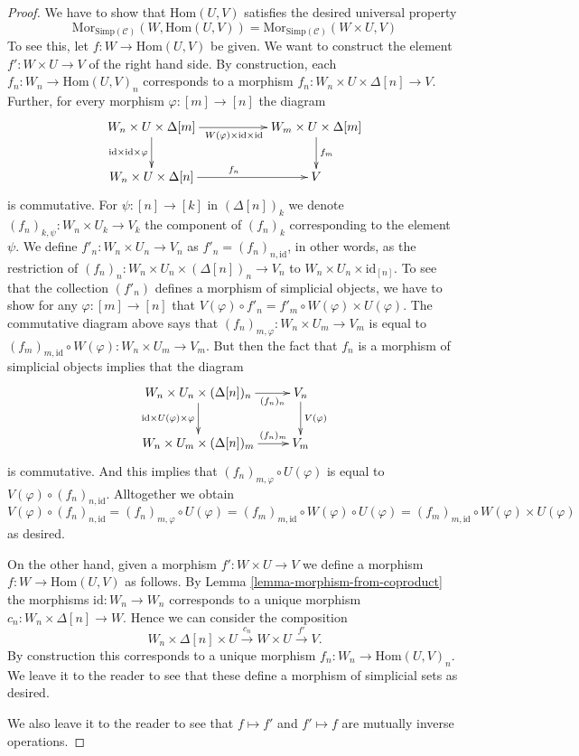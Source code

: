 \begin{proof}
\medskip\noindent
We have to show that $\text{Hom}(U, V)$ satisfies the desired
universal property
$$
\text{Mor}_{\text{Simp}(\mathcal{C})}(W, \text{Hom}(U, V))
=
\text{Mor}_{\text{Simp}(\mathcal{C})}(W \times U, V)
$$
To see this, let $f : W \to \text{Hom}(U, V)$ be given.
We want to construct the element $f' : W \times U \to V$
of the right hand side.
By construction, each $f_n : W_n \to \text{Hom}(U, V)_n$
corresponds to a morphism
$f_n : W_n \times U \times \Delta[n] \to V$. Further,
for every morphism $\varphi : [m] \to [n]$ the
diagram 
$$
\xymatrix{
W_n \times U \times \Delta[m]
\ar[rr]_{W(\varphi)\times \text{id} \times \text{id}}
\ar[d]_{\text{id} \times \text{id} \times \varphi} & &
W_m \times U \times \Delta[m] \ar[d]^{f_m} \\
W_n \times U \times \Delta[n] \ar[rr]^{f_n} & & V
}
$$
is commutative. For $\psi : [n] \to [k]$ in $(\Delta[n])_k$
we denote $(f_n)_{k, \psi} : W_n \times U_k \to V_k$
the component of $(f_n)_k$ corresponding to the element
$\psi$. We define $f'_n : W_n \times U_n \to V_n$
as $f'_n = (f_n)_{n, \text{id}}$, in other words, as 
the restriction of
$(f_n)_n : W_n \times U_n \times (\Delta[n])_n \to V_n$
to $W_n \times U_n \times \text{id}_{[n]}$.
To see that the collection $(f'_n)$ defines a
morphism of simplicial objects, we have to show
for any $\varphi : [m] \to [n]$ that
$V(\varphi) \circ f'_n =
f'_m \circ W(\varphi) \times U(\varphi)$.
The commutative diagram above says that
$(f_n)_{m, \varphi} : W_n \times U_m \to V_m$
is equal to
$(f_m)_{m, \text{id}} \circ W(\varphi) :
W_n \times U_m \to V_m$.
But then the fact that $f_n$ is a morphism of simplicial
objects implies that the diagram
$$
\xymatrix{
W_n \times U_n \times (\Delta[n])_n
\ar[r]_-{(f_n)_n}
\ar[d]_{\text{id}\times U(\varphi) \times \varphi}
& V_n \ar[d]^{V(\varphi)} \\
W_n \times U_m \times (\Delta[n])_m \ar[r]^-{(f_n)_m} & V_m
}
$$
is commutative. And this implies that
$(f_n)_{m, \varphi} \circ U(\varphi)$ is
equal to $V(\varphi) \circ (f_n)_{n, \text{id}}$.
Alltogether we obtain
$
V(\varphi) \circ (f_n)_{n, \text{id}}
=
(f_n)_{m, \varphi} \circ U(\varphi)
=
(f_m)_{m, \text{id}} \circ W(\varphi)\circ U(\varphi)
=
(f_m)_{m, \text{id}} \circ W(\varphi)\times U(\varphi)
$
as desired.

\medskip\noindent
On the other hand, given a morphism
$f' : W \times U \to V$ we define
a morphism $f : W \to \text{Hom}(U, V)$ 
as follows. By Lemma \ref{lemma-morphism-from-coproduct} the morphisms
$\text{id} : W_n \to W_n$ corresponds to a unique
morphism $c_n : W_n \times \Delta[n] \to W$.
Hence we can consider the composition
$$
W_n \times \Delta[n] \times U
\xrightarrow{c_n}
W \times U
\xrightarrow{f'}
V.
$$
By construction this corresponds to a unique morphism
$f_n : W_n \to \text{Hom}(U, V)_n$. We leave it to the reader
to see that these define a morphism of simplicial sets as
desired.

\medskip\noindent
We also leave it to the reader to see that
$f \mapsto f'$ and $f' \mapsto f$ are mutually inverse
operations.
\end{proof}

